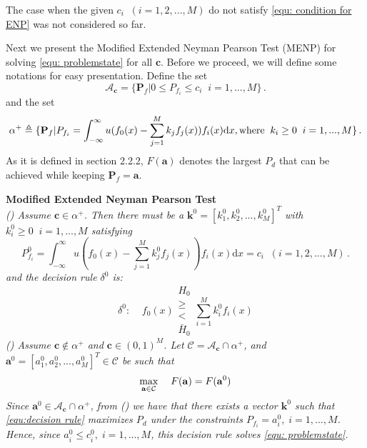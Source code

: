 The case when the given $c_i\;\; (i= 1, 2, ..., M)$ do not satisfy \eqref{equ: condition for ENP} was not considered so far. 


Next we present the Modified Extended Neyman Pearson Test (MENP) for solving \eqref{equ: problemstate} for all $\mathbf{c}$.
Before we proceed, we will define some notations for easy presentation.
Define the set 
\[\mathcal{A}_\mathbf{c} = \{
  \mathbf{P}_f | 0 \leq P_{f_i} \leq c_i
  \;\;i=1,  ..., M\}\,.
\]
and the set 
\[
\alpha^+ \triangleq \{\mathbf{P}_f | P_{f_i} = \int_{-\infty}^{\infty} u(f_0(x) - \sum_{j=1}^{M}k_j f_j(x)) f_i(x) \mathrm{d}x, \text{where\;\;} k_i \geq 0 \;\;i=1, ..., M\}\,.
\]
As it is defined in section 2.2.2, $F(\mathbf{a})$ denotes the largest $P_d$ that can be achieved while keeping $\mathbf{P}_{f} = \mathbf{a}$.  

\noindent \textbf{Modified Extended Neyman Pearson Test}
\noindent \textit{
  \\\textnormal{()} Assume $\mathbf{c} \in \alpha^+$. Then there must be a $\mathbf{k}^0 = [k_1^0, k_2^0, ..., k_M^0]^T$ with $k_i^0 \geq 0\;\;i=1, ..., M$ satisfying
}
\begin{equation}
\label{equ:Pf}
  P_{f_i}^0 = \int_{-\infty}^{\infty} u(f_0(x) - \sum_{j=1}^{M}k_j^0f_j(x))f_i(x)\mathrm{d}x = c_i \;\; (i= 1, 2, ..., M)\,.
\end{equation}
\textit{
    and the decision rule $\delta^0$ is:
}
\begin{equation}
\label{equ:decision rule}
\delta^0:\;\;\;\;f_0(x) \substack{H_0 \\ \geq \\ < \\ \bar{H}_0} \sum_{i=1}^{M}k_i^0f_i(x)
\end{equation}
\textit{
  \noindent \textnormal{()} Assume $\mathbf{c} \notin \alpha^+$ and $\mathbf{c} \in (0, 1)^M$. Let $\mathcal{C} = \mathcal{A}_{\mathbf{c}} \cap \alpha^+$, and $\mathbf{a}^0 = [a_1^0, a_2^0, ..., a_M^0]^T \in \mathcal{C}$ be such that
}
\begin{equation}
\label{equ: F0}
\max_{\mathbf{a} \in \mathcal{C}}\;\;\;\;F(\mathbf{a}) = F(\mathbf{a}^0)\\
\end{equation}
\textit{
Since $\mathbf{a}^0 \in \mathcal{A}_{\mathbf{c}} \cap \alpha^+$, from \textnormal{()} we have that there exists a vector $\mathbf{k}^0$ such that \eqref{equ:decision rule}  maximizes $P_d$ under the constraints $P_{f_i} = a_i^0, \;i=1, ..., M$. Hence, since $a_i^0 \leq c_i^0, \;i=1, ..., M$, this decision rule solves \eqref{equ: problemstate}.
}

